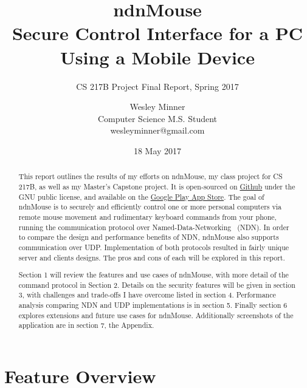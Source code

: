 \documentclass{sig-alternate}
\renewcommand\_{\textunderscore\allowbreak}  %
\begin{document}
	
\title{ndnMouse\\Secure Control Interface for a PC Using a Mobile Device}
\subtitle{CS 217B Project Final Report, Spring 2017}
\author{
	Wesley Minner\\
	Computer Science M.S. Student\\
	wesleyminner@gmail.com
}

\date{18 May 2017}
\maketitle

\begin{abstract}
This report outlines the results of my efforts on ndnMouse, my class project for CS 217B, as well as my Master's Capstone project. It is open-sourced on \href{https://github.com/wminner/ndnMouse}{Github} under the GNU public license, and available on the \href{https://play.google.com/store/apps/details?id=edu.ucla.cs.ndnmouse}{Google Play App Store}. The goal of ndnMouse is to securely and efficiently control one or more personal computers via remote mouse movement and rudimentary keyboard commands from your phone, running the communication protocol over Named-Data-Networking~\cite{ndn} (NDN). In order to compare the design and performance benefits of NDN, ndnMouse also supports communication over UDP. Implementation of both protocols resulted in fairly unique server and clients designs. The pros and cons of each will be explored in this report.

Section 1 will review the features and use cases of ndnMouse, with more detail of the command protocol in Section 2. Details on the security features will be given in section 3, with challenges and trade-offs I have overcome listed in section 4. Performance analysis comparing NDN and UDP implementations is in section 5. Finally section 6 explores extensions and future use cases for ndnMouse. Additionally screenshots of the application are in section 7, the Appendix.
\end{abstract}


\section{Feature Overview}
%
\end{document}
